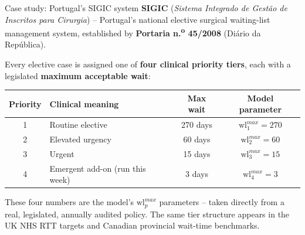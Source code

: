 \documentclass[10pt,aspectratio=169]{beamer}
\begin{document}
\begin{frame}{Case study: Portugal's SIGIC system}
  \textbf{SIGIC} (\emph{Sistema Integrado de Gest\~ao de Inscritos para
  Cirurgia}) -- Portugal's national elective surgical waiting-list
  management system, established by \textbf{Portaria n.\textsuperscript{o}
  45/2008} (Di\'ario da Rep\'ublica).

  \vspace{0.4em}
  Every elective case is assigned one of \textbf{four clinical priority
  tiers}, each with a legislated \textbf{maximum acceptable wait}:

  \vspace{0.3em}
  \begin{center}\small
  \begin{tabular}{clcc}
    \toprule
    Priority & Clinical meaning & Max wait & Model parameter \\
    \midrule
    1 & Routine elective & 270 days & $\text{wl}^{max}_1 = 270$ \\
    2 & Elevated urgency & 60 days  & $\text{wl}^{max}_2 = 60$  \\
    3 & Urgent           & 15 days  & $\text{wl}^{max}_3 = 15$  \\
    4 & Emergent add-on (run this week) & 3 days & $\text{wl}^{max}_4 = 3$ \\
    \bottomrule
  \end{tabular}
  \end{center}
  \vspace{0.3em}
  \footnotesize These four numbers are the model's $\text{wl}^{max}_p$
  parameters -- taken directly from a real, legislated, annually audited
  policy. The same tier structure appears in the UK NHS RTT targets and
  Canadian provincial wait-time benchmarks.
\end{frame}
\end{document}

